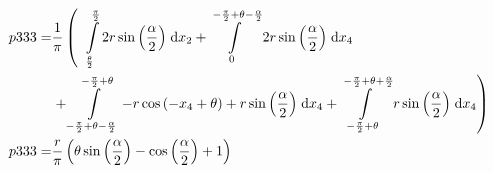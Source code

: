 \begin{align}
    p333 =&\frac{1}{\pi} \left(\;\;\int\limits_{\frac{\theta}{2}}^{\frac{\pi}{2}}2 r \sin{\left (\frac{\alpha}{2} \right )}\;\mathrm{d}x_{2}+\int\limits_{0}^{- \frac{\pi}{2} + \theta - \frac{\alpha}{2}}2 r \sin{\left (\frac{\alpha}{2} \right )}\;\mathrm{d}x_{4}\right.\notag\\
 &\left.+\int\limits_{- \frac{\pi}{2} + \theta - \frac{\alpha}{2}}^{- \frac{\pi}{2} + \theta}- r \cos{\left (- x_{4} + \theta \right )} + r \sin{\left (\frac{\alpha}{2} \right )}\;\mathrm{d}x_{4}+\int\limits_{- \frac{\pi}{2} + \theta}^{- \frac{\pi}{2} + \theta + \frac{\alpha}{2}}r \sin{\left (\frac{\alpha}{2} \right )}\;\mathrm{d}x_{4}\right)\label{p333Def}\\
    p333 =& \frac{r}{\pi} \left(\theta \sin{\left (\frac{\alpha}{2} \right )} - \cos{\left (\frac{\alpha}{2} \right )} + 1\right)\label{p333Sln}
\end{align}